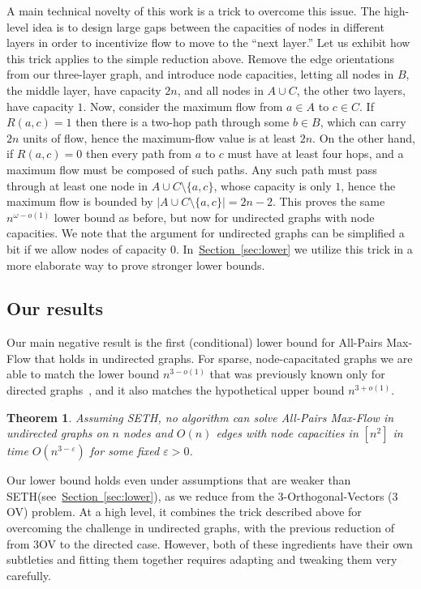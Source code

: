 \documentclass[11pt]{article}
\numberwithin{equation}{section}
\newtheorem{theorem}{Theorem}[section]
\theoremstyle{definition}
\theoremstyle{plain}
\newcommand{\expref}[2]{\hyperref[#2]{#1~\ref{#2}}}
\theoremstyle{plain}
\newcommand{\ProblemName}[1]{\textsf{#1}}
\newcommand{\SETH}{SETH\xspace}
\newcommand{\APMF}{\ProblemName{All-Pairs Max-Flow}\xspace}
\newcommand{\TOV}{\ProblemName{$3$OV}\xspace}
\newcommand\eps{\varepsilon}
\begin{document}
A main technical novelty of this work is a trick to overcome this issue. The high-level idea is to design large gaps between the capacities of nodes in different layers in order to incentivize flow to move to the ``next layer.''
Let us exhibit how this trick applies to the simple reduction above.
Remove the edge orientations from our three-layer graph,
and introduce node capacities,
letting all nodes in $B$, the middle layer, have capacity $2n$,
and all nodes in $A \cup C$, the other two layers, have capacity $1$.
Now, consider the maximum flow from $a \in A$ to $c \in C$.
If $R(a,c)=1$ then there is a two-hop path through some $b \in B$,
which can carry $2n$ units of flow,
hence the maximum-flow value is at least $2n$.
On the other hand, if $R(a,c)=0$ then every path from $a$ to $c$
must have at least four hops, and a maximum flow must be composed of such paths.
Any such path must pass through at least one node in
$A \cup C\setminus\{a,c\}$, whose capacity is only $1$,
hence the maximum flow is bounded by $|A \cup C \setminus \{ a,c \}| = 2n-2$.
This proves the same $n^{\omega-o(1)}$ lower bound as before,
but now for undirected graphs with node capacities.
We note that the argument for undirected graphs can be simplified a bit if we allow nodes of capacity $0$.
In~\expref{Section}{sec:lower} we utilize this trick in a more elaborate way to prove stronger lower bounds.

\subsection{Our results}

Our main negative result is the first (conditional) lower bound for \APMF that holds in undirected graphs.
For sparse, node-capacitated graphs we are able to match the lower bound $n^{3-o(1)}$ that was previously known only for directed graphs~\cite{KT18},
and it also matches the hypothetical upper bound $n^{3+o(1)}$.

\begin{theorem}
\label{thm1}
Assuming \SETH, no algorithm can solve \APMF in undirected graphs on $n$ nodes and $O(n)$ edges with node capacities in $[n^2]$ in time $O(n^{3-\eps})$
for some fixed $\eps>0$.
\end{theorem}

Our lower bound holds even under assumptions that are weaker than \SETH (see~\expref{Section}{sec:lower}), as we reduce from the $3$-Orthogonal-Vectors (\TOV) problem.
At a high level, it combines the trick described above for overcoming the challenge in undirected graphs, with the previous reduction of \cite{KT18} from \TOV to the directed case.
However, both of these ingredients have their own subtleties and fitting them together requires adapting and tweaking them very carefully.
\end{document}
